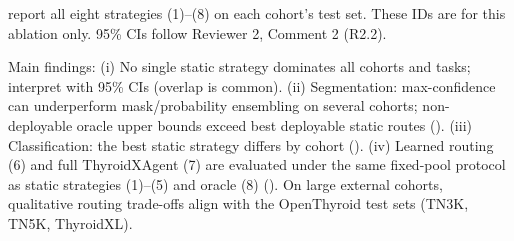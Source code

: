 \begin{authorresponse}
 report all eight strategies (1)--(8) on each cohort's test set. These IDs are for this ablation only. 95\% CIs follow Reviewer 2, Comment 2 (R2.2).\par
Main findings: (i) No single static strategy dominates all cohorts and tasks; interpret with 95\% CIs (overlap is common). (ii) Segmentation: max-confidence can underperform mask/probability ensembling on several cohorts; non-deployable oracle upper bounds exceed best deployable static routes (). (iii) Classification: the best static strategy differs by cohort (). (iv) Learned routing (6) and full ThyroidXAgent (7) are evaluated under the same fixed-pool protocol as static strategies (1)--(5) and oracle (8) (). On large external cohorts, qualitative routing trade-offs align with the OpenThyroid test sets (TN3K, TN5K, ThyroidXL).\par
\par
\end{authorresponse}

